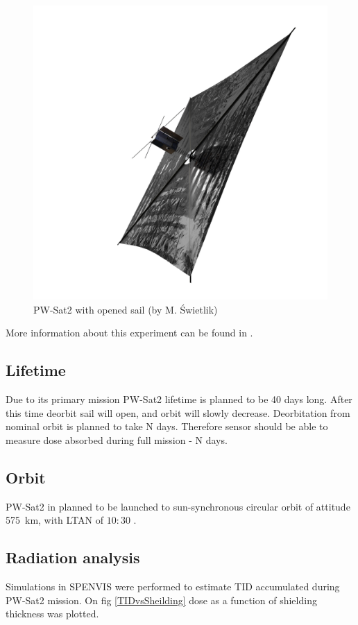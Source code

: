     \begin{figure}[H]
        \centering
        \includegraphics[width=0.7\paperwidth]{img/PW-Sat2_render_02.png}
        \caption{PW-Sat2 with opened sail (by M. Świetlik)}
        \label{PW-Sat_render_sail}
    \end{figure}

    More information about this experiment can be found in \cite{DDC_article}.

\subsection{Lifetime}
    Due to its primary mission PW-Sat2 lifetime is planned to be 40 days long. After this time deorbit sail will open, and orbit will slowly decrease. Deorbitation from nominal orbit is planned to take N days. Therefore sensor should be able to measure dose absorbed during full mission - N days.

\subsection{Orbit}
    PW-Sat2 in planned to be launched to sun-synchronous circular orbit of attitude \SI{575}{\kilo\meter}, with LTAN of $10:30$ \cite{PWSAT_MA_CDR}.


\subsection{Radiation analysis}
    Simulations in SPENVIS \cite{SPENVIS_URL} were performed to estimate TID accumulated during PW-Sat2 mission. On fig \ref{TIDvsSheilding} dose as a function of shielding thickness was plotted.

